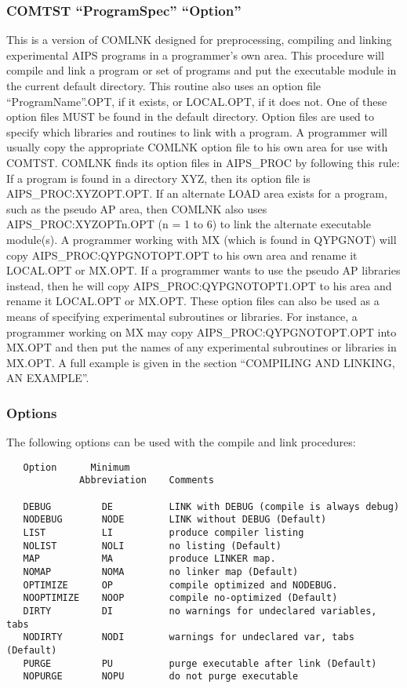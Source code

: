\subsubsection{COMTST ``ProgramSpec'' ``Option''}
This is a version of COMLNK designed for preprocessing, compiling and linking
experimental AIPS programs in a programmer's own area.  This procedure
will compile and link a program or set of programs and put the
executable module in the current default directory.  This routine also
uses an option file ``ProgramName''.OPT, if it exists, or LOCAL.OPT, if
it does not.  One of these option files MUST be found in the default
directory.  Option files are used to specify which libraries and
routines to link with a program.  A programmer will usually copy the
appropriate COMLNK option file to his own area for use with COMTST.
COMLNK finds its option files in AIPS\_PROC by following this rule:
If a program is found in a directory XYZ, then its option file is
AIPS\_PROC:XYZOPT.OPT. If an alternate LOAD area exists for a program,
such as the pseudo AP area, then COMLNK also uses
AIPS\_PROC:XYZOPTn.OPT (n = 1 to 6) to link the alternate executable
module(s). A programmer working with MX (which is found in QYPGNOT)
will copy AIPS\_PROC:QYPGNOTOPT.OPT to his own area and rename it
LOCAL.OPT or MX.OPT.  If a programmer wants to use the pseudo AP
libraries instead, then he will copy AIPS\_PROC:QYPGNOTOPT1.OPT to his
area and rename it LOCAL.OPT or MX.OPT.  These option files can also
be used as a means of specifying experimental subroutines or
libraries.  For instance, a programmer working on MX may copy
AIPS\_PROC:QYPGNOTOPT.OPT into MX.OPT and then put the names of any
experimental subroutines or libraries in MX.OPT. A full example is
given in the section ``COMPILING AND LINKING, AN EXAMPLE''.

\subsubsection{Options}
The following options can be used with the compile and link
procedures:

\begin{verbatim}
   Option      Minimum
             Abbreviation    Comments

   DEBUG         DE          LINK with DEBUG (compile is always debug)
   NODEBUG       NODE        LINK without DEBUG (Default)
   LIST          LI          produce compiler listing
   NOLIST        NOLI        no listing (Default)
   MAP           MA          produce LINKER map.
   NOMAP         NOMA        no linker map (Default)
   OPTIMIZE      OP          compile optimized and NODEBUG.
   NOOPTIMIZE    NOOP        compile no-optimized (Default)
   DIRTY         DI          no warnings for undeclared variables, tabs
   NODIRTY       NODI        warnings for undeclared var, tabs (Default)
   PURGE         PU          purge executable after link (Default)
   NOPURGE       NOPU        do not purge executable


\end{verbatim}
